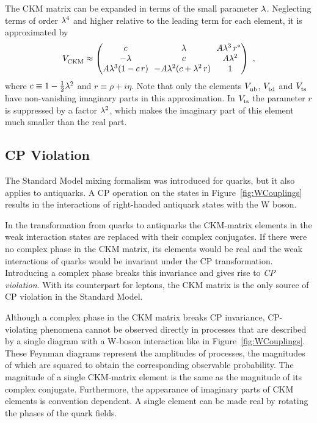 The CKM matrix can be expanded in terms of the small parameter $\lambda$. Neglecting terms of order $\lambda^4$ and higher relative to the
leading term for each element, it is approximated by \cite{Charles:2004jd}
\begin{equation}
  \label{eq:CKMApprox}
  \VCKM \approx
    \begin{pmatrix}
      c                  &  \lam                           &  \!\! A\lam^3\,r^* \\
      -\lam              &  c                              &  A\lam^2           \\
      A\lam^3(1 - c\,r)  &  \!\! -A\lam^2 (c + \lam^2\,r)  &  1
    \end{pmatrix}
    \ ,
\end{equation}
where $c\equiv1 - \tfrac{1}{2}\lambda^2$ and $r\equiv\rho+i\eta$. Note that only the elements $\Vub$, $\Vtd$ and $\Vts$ have non-vanishing
imaginary parts in this approximation. In $\Vts$ the parameter $r$ is suppressed by a factor $\lambda^2$, which makes the imaginary part of
this element much smaller than the real part.


\subsection{CP Violation}
\label{subsec:intro_mixCPV_CPV}

The Standard Model mixing formalism was introduced for quarks, but it also applies to antiquarks. A CP operation on the states in
Figure~\ref{fig:WCouplings} results in the interactions of right-handed antiquark states with the W boson.

In the transformation from quarks to antiquarks the CKM-matrix elements in the weak interaction states are replaced with their complex
conjugates. If there were no complex phase in the CKM matrix, its elements would be real and the weak interactions of quarks would be
invariant under the CP transformation. Introducing a complex phase breaks this invariance and gives rise to \emph{CP violation}. With its
counterpart for leptons, the CKM matrix is the only source of CP violation in the Standard Model.

Although a complex phase in the CKM matrix breaks CP invariance, CP-violating phenomena cannot be observed directly in processes that are
described by a single diagram with a W-boson interaction like in Figure~\ref{fig:WCouplings}. These Feynman diagrams represent the
amplitudes of processes, the magnitudes of which are squared to obtain the corresponding observable probability. The magnitude of a single
CKM-matrix element is the same as the magnitude of its complex conjugate. Furthermore, the appearance of imaginary parts of CKM elements is
convention dependent. A single element can be made real by rotating the phases of the quark fields.


